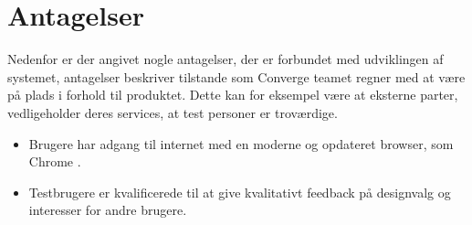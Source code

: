 \section{Antagelser}
Nedenfor er der angivet nogle antagelser, der er forbundet med udviklingen af systemet, antagelser beskriver tilstande som Converge teamet regner med at være på plads i forhold til produktet. Dette kan for eksempel være at eksterne parter, vedligeholder deres services, at test personer er troværdige.

\begin{itemize}
    \item Brugere har adgang til internet med en moderne og opdateret browser, som Chrome \cite{document-terms}.
    \item Testbrugere er kvalificerede til at give kvalitativt feedback på designvalg og interesser for andre brugere.
\end{itemize}



